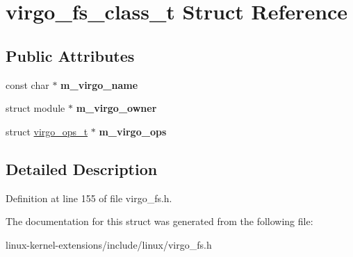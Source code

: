 \hypertarget{structvirgo__fs__class__t}{\section{virgo\-\_\-fs\-\_\-class\-\_\-t Struct Reference}
\label{structvirgo__fs__class__t}
}
\subsection*{Public Attributes}
\begin{DoxyCompactItemize}
\item 
\hypertarget{structvirgo__fs__class__t_a5763bf64788ebbe5dc9e73339a4b9a61}{const char $\ast$ {\bfseries m\-\_\-virgo\-\_\-name}}\label{structvirgo__fs__class__t_a5763bf64788ebbe5dc9e73339a4b9a61}

\item 
\hypertarget{structvirgo__fs__class__t_ac383147ff5b5476c911d366707a29aea}{struct module $\ast$ {\bfseries m\-\_\-virgo\-\_\-owner}}\label{structvirgo__fs__class__t_ac383147ff5b5476c911d366707a29aea}

\item 
\hypertarget{structvirgo__fs__class__t_a02bcddf065410b7ffd7a2a72937da480}{struct \hyperlink{structvirgo__ops__t}{virgo\-\_\-ops\-\_\-t} $\ast$ {\bfseries m\-\_\-virgo\-\_\-ops}}\label{structvirgo__fs__class__t_a02bcddf065410b7ffd7a2a72937da480}

\end{DoxyCompactItemize}


\subsection{Detailed Description}


Definition at line 155 of file virgo\-\_\-fs.\-h.



The documentation for this struct was generated from the following file\-:\begin{DoxyCompactItemize}
\item 
linux-\/kernel-\/extensions/include/linux/virgo\-\_\-fs.\-h\end{DoxyCompactItemize}
